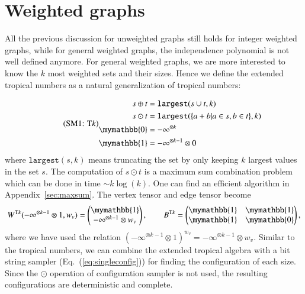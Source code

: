 \documentclass[onefignum, onetabnum]{siamart190516}
\newcommand{\eqname}[1]{\stepcounter{equation}\tag{\theequation : #1}}
\newcommand{\<}{\langle}
\renewcommand{\>}{\rangle}
\newcommand{\Eq}[1]{Eq.~(\ref{#1})}
\newcommand{\App}[1]{Appendix~\ref{#1}}
\begin{document}
\section{Weighted graphs}\label{sec:weighted}
All the previous discussion for unweighted graphs still holds for integer weighted graphs,
while for general weighted graphs, the independence polynomial is not well defined anymore.
For general weighted graphs, we are more interested to know the $k$ most weighted sets and their sizes.
Hence we define the extended tropical numbers as a natural generalization of tropical numbers:

\begin{equation}
\eqname{T$k$}
\begin{split}
    s \oplus t &= \texttt{largest}(s \cup t, k)\\
    s \odot t &= \texttt{largest}(\{a+b| a \in s, b\in t\}, k)\\
    \mymathbb{0} &= -\infty^{\otimes k}\\
    \mymathbb{1} &= -\infty^{\otimes k-1} \otimes 0
\end{split}\label{eq:ext-tropical}
\end{equation}
where $\texttt{largest}(s, k)$ means truncating the set by only keeping $k$ largest values in the set $s$.
The computation of $s \odot t$ is a maximum sum combination problem which can be done in time $\sim k\log(k)$.
One can find an efficient algorithm in \App{sec:maxsum}.
The vertex tensor and edge tensor become
\begin{equation}
    W^{{\rm T}k}(-\infty^{\otimes k-1} \otimes 1, w_v) = \left(\begin{matrix}
        \mymathbb{1} \\
        -\infty^{\otimes k-1} \otimes w_v
    \end{matrix}\right),   
    \qquad
        B^{{\rm T}k} = \left(\begin{matrix}
        \mymathbb{1}  & \mymathbb{1} \\
        \mymathbb{1} & \mymathbb{0}
    \end{matrix}\right),
\end{equation}
where we have used the relation $(-\infty^{\otimes k-1} \otimes 1)^{w_v} = -\infty^{\otimes k-1} \otimes w_v$.
Similar to the tropical numbers, we can combine the extended tropical algebra with a bit string sampler (\Eq{eq:singleconfig}) for finding the configuration of each size.
Since the $\odot$ operation of configuration sampler is not used, the resulting configurations are deterministic and complete.
\end{document}
